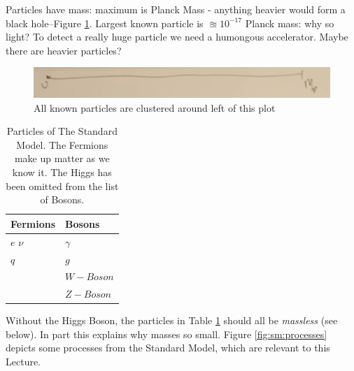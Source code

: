 \documentclass[]{article}
\begin{document}
Particles have mass: maximum is Planck Mass - anything heavier would form a black hole--Figure \ref{fig:higgs-masses}. Largest known particle is $\approxeq 10^{-17}$ Planck mass: why so light? To detect a really huge particle we need a humongous accelerator. Maybe there are heavier particles?

\begin{figure}[H]
	\caption{All known particles are clustered around left of this plot}\label{fig:higgs-masses}
	\includegraphics[width=0.6\textheight]{higgs-masses}
\end{figure}

\begin{table}[H]
	\begin{center}
		\caption[Particles of The Standard Model]{Particles of The Standard Model. The Fermions make up matter as we know it. The Higgs has been omitted from the list of Bosons.}\label{table:standard-model}
		\begin{tabular}{|l|l|} \hline
			Fermions & Bosons\\ \hline
			$e$ $\nu$&$\gamma$\\
			$q$&$g$\\
			&$W-Boson$\\
			&$Z-Boson$\\ \hline
		\end{tabular}
	\end{center}
\end{table}

Without the Higgs Boson, the particles in Table \ref{table:standard-model} should all be \emph{massless} (see below). In part this explains why masses so small. Figure \ref{fig:sm:processes} depicts some processes from the Standard Model, which are relevant to this Lecture.
\end{document}
